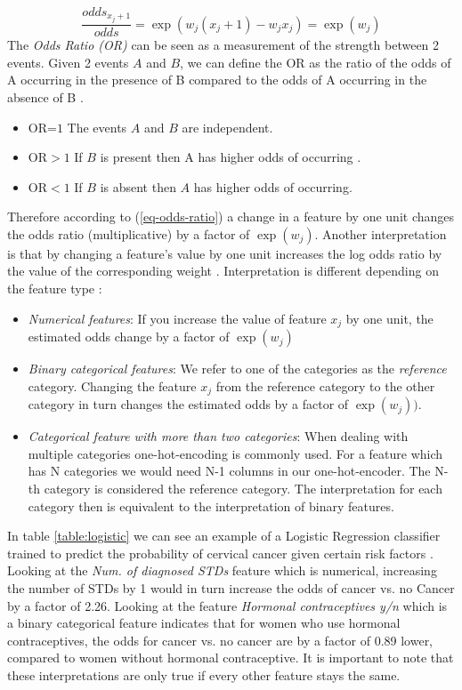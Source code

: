 \begin{equation}
    \frac{odds_{x_{j}+1}}{odds} = \exp(w_{j}(x_{j} + 1) - w_{j}x_{j}) = \exp(w_{j})
    \label{eq-odds-ratio}
\end{equation}
The \emph{Odds Ratio (OR)} can be seen as a measurement of the strength between 2 events. Given 2 events $A$ and $B$, we can define the OR as the ratio of the odds of A occurring in the presence of B compared to the odds of A occurring in the absence of B \cite {Szumilas2010ExplainingRatios}.
\begin{itemize}
    \item OR=$1$ The events $A$ and $B$ are independent.
    \item OR$>1$ If $B$ is present then A has higher odds of occurring .
    \item OR$<1$ If $B$ is absent then $A$ has higher odds of occurring.
\end{itemize}
Therefore according to (\ref{eq-odds-ratio}) a change in a feature by one unit changes the odds ratio (multiplicative) by a factor of $\exp(w_{j})$. Another interpretation is that by changing a feature's value by one unit increases the log odds ratio by the value of the corresponding weight \cite{molnar2019}. Interpretation is different depending on the feature type \cite{molnar2019}:
\begin{itemize}
    \item \emph{Numerical features}: If you increase the value of feature $x_{j}$ by one unit, the estimated odds change by a factor of $\exp(w_{j})$
    \item \emph{Binary categorical features}: We refer to one of the categories as the \emph{reference} category. Changing the feature $x_{j}$ from the reference category to the other category in turn changes the estimated odds by a factor of $\exp(w_{j}))$.
    \item \emph{Categorical feature with more than two categories}:  When dealing with multiple categories one-hot-encoding is commonly used. For a feature which has N categories we would need N-1 columns in our one-hot-encoder. The N-th category is  considered the reference category. The interpretation for each category then is equivalent to the interpretation of binary features.
\end{itemize}
In table \ref{table:logistic} we can see an example of a Logistic Regression classifier trained to predict the probability of cervical cancer given certain risk factors  \cite{molnar2019}. Looking at the \emph{Num. of diagnosed STDs} feature which is numerical, increasing the number of STDs by 1 would in turn increase the odds of cancer vs. no Cancer by a factor of 2.26. Looking at the feature \emph{Hormonal contraceptives y/n} which is a binary categorical feature indicates that for women who use hormonal contraceptives, the odds for cancer vs. no cancer are by a factor of 0.89 lower, compared to women without hormonal contraceptive. It is important to note that these interpretations are only true if every other feature stays the same.
